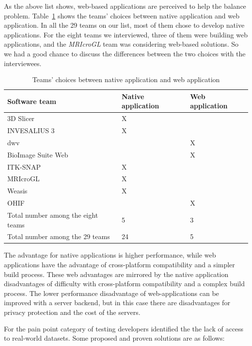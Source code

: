 \documentclass[final, 3p, times, authoryear]{elsarticle}
\begin{document}
As the above list shows, web-based applications are perceived to help the
balance problem.  Table~\ref{tab_native_vs_web} shows the teams' choices between
native application and web application. In all the 29 teams on our list, most of
them chose to develop native applications. For the eight teams we interviewed,
three of them were building web applications, and the \textit{MRIcroGL} team was
considering web-based solutions. So we had a good chance to discuss the
differences between the two choices with the interviewees.

\begin{table}[!ht]
\centering
\begin{tabular}{lll}
\toprule
Software team & Native application & Web application \\ 
\midrule
3D Slicer & X & \\
INVESALIUS 3 & X & \\
dwv & & X \\
BioImage Suite Web & & X \\
ITK-SNAP & X & \\
MRIcroGL & X & \\
Weasis & X & \\
OHIF & & X \\ 
\midrule
Total number among the eight teams & 5 & 3 \\
Total number among the 29 teams & 24 & 5 \\ 
\bottomrule
\end{tabular}
\caption{Teams' choices between native application and web application}
\label{tab_native_vs_web}
\end{table}

The advantage for native applications is higher performance, while web
applications have the advantage of cross-platform compatibility and a simpler
build process.  These web advantages are mirrored by the native application
disadvantages of difficulty with cross-platform compatibility and a complex
build process.  The lower performance disadvantage of web-applications can be
improved with a server backend, but in this case there are disadvantages for
privacy protection and the cost of the servers.

For the pain point category of testing developers identified the the lack of access to
real-world datasets.  Some proposed and proven solutions are as follows:
\end{document}
